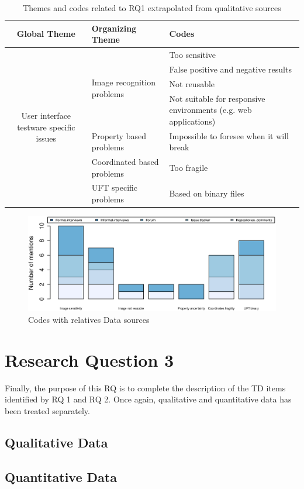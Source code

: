   
\begin{table}
\renewcommand{\arraystretch}{1.5}
\centering
\begin{tabular}{ c p{4.3cm} p{4.6cm}}
    
    \hline       
    {\large Global Theme} & {\large Organizing Theme} & {\large Codes}\\
    \hline
    
    \multirow{7}{*}{\parbox[b]{4.3cm}{
        User interface testware specific issues
    }
    } & \multirow{4}{*}{\parbox[c]{4.3cm}{Image recognition problems}}
        & Too sensitive \\
        & & False positive and negative results\\
        & & Not reusable\\ 
        & & Not suitable for responsive environments (e.g. web applications)\\ \cline{2-3}
        
    & Property based problems & Impossible to foresee when it will break\\ \cline{2-3}
        
    & Coordinated based problems  & Too fragile\\ \cline{2-3}
        
    & UFT specific problems & Based on binary files\\
        
    \hline
\end{tabular}
\caption{Themes and codes related to RQ1 extrapolated from qualitative sources}
\label{tab:themes_rq2}
\end{table}

\begin{figure}[!Htb]
    \centering
    \includegraphics[width=\textwidth,keepaspectratio]{figure/results/rq2/sources.eps}
    \caption{Codes with relatives Data sources}
    \label{fig:rq2_sources}
\end{figure}


\section{Research Question 3}

Finally, the purpose of this RQ is to complete the description of the TD items identified by RQ 1 and RQ 2. Once again, qualitative and quantitative data has been treated separately.

\subsection{Qualitative Data}
    

\subsection{Quantitative Data}
    

